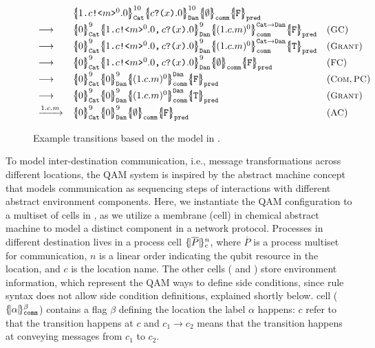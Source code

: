 \begin{figure}[t]
{\footnotesize
\[
\begin{array}{lll}
&
\pcellb{\qsend{1}{c}{m}^0.0}{10}{\cn{Cat}}
\pcellb{\qrev{c}{x}.0}{10}{\cn{Dan}} 
\qcellb{\emptyset}{\cn{comm}}
\qcellb{\texttt{F}}{\cn{pred}}
&
\\[0.3em]
\longrightarrow
&
\pcellb{0}{9}{\cn{Cat}}
\pcellb{\pard{\qsend{1}{c}{m}^0.0}{\qrev{c}{x}.0}}{9}{\cn{Dan}} 
\pcellb{(1.c.m)^0}{\cn{Cat}\rightarrow\cn{Dan}}{\cn{comm}}
\qcellb{\texttt{F}}{\cn{pred}}
&
(\rulelab{GC})
\\[0.3em]
\longrightarrow
&
\pcellb{0}{9}{\cn{Cat}}
\pcellb{\pard{\qsend{1}{c}{m}^0.0}{\qrev{c}{x}.0}}{9}{\cn{Dan}} 
\pcellb{(1.c.m)^0}{\cn{Cat}\rightarrow\cn{Dan}}{\cn{comm}}
\qcellb{\texttt{T}}{\cn{pred}}
&
(\rulelab{Grant})
\\[0.3em]
\longrightarrow
&
\pcellb{0}{9}{\cn{Cat}}
\pcellb{\pard{\qsend{1}{c}{m}^0.0}{\qrev{c}{x}.0}}{9}{\cn{Dan}} 
\qcellb{\emptyset}{\cn{comm}}
\qcellb{\texttt{F}}{\cn{pred}}
&
(\rulelab{FC})
\\[0.3em]
\longrightarrow
&
\pcellb{0}{9}{\cn{Cat}}
\pcellb{0}{9}{\cn{Dan}} 
\pcellb{(1.c.m)^0}{\cn{Dan}}{\cn{comm}}
\qcellb{\texttt{F}}{\cn{pred}}
&
(\rulelab{Com},\rulelab{PC})
\\[0.3em]
\longrightarrow
&
\pcellb{0}{9}{\cn{Cat}}
\pcellb{0}{9}{\cn{Dan}} 
\pcellb{(1.c.m)^0}{\cn{Dan}}{\cn{comm}}
\qcellb{\texttt{T}}{\cn{pred}}
&
(\rulelab{Grant})
\\[0.3em]
\xrightarrow{1.c.m}&
\pcellb{0}{9}{\cn{Cat}}
\pcellb{0}{9}{\cn{Dan}} 
\qcellb{\emptyset}{\cn{comm}}
\qcellb{\texttt{F}}{\cn{pred}}
&
(\rulelab{AC})
\end{array}
\]
}
\caption{Example transitions based on the model in .}
  \label{fig:q-pi-example}
\end{figure}

To model inter-destination communication, i.e., message transformations across different locations,
the QAM system is inspired by the abstract machine concept that models communication as sequencing steps of
interactions with different abstract environment components.
Here, we instantiate the QAM configuration to a multiset of cells in ,
as we utilize a membrane (cell) in chemical abstract machine to model a distinct component in a network protocol.
Processes in different destination lives in a process cell $\{\!| \overline{P} |\!\}^{n}_{c}$, where $\overline{P}$ is a process multiset for communication, $n$ is a linear order indicating the qubit resource in the location, and $c$ is the location name.
The other cells ( and ) store environment information, which represent the QAM ways to define side conditions, since rule syntax does not allow side condition definitions, explained shortly below. 
 cell ($\{\!| \alpha |\!\}^{\beta}_{\texttt{comm}}$) contains a flag $\beta$ defining the location the label $\alpha$ happens: $c$ refer to that the transition happens at $c$ and $c_1\rightarrow c_2$ means that the transition happens at conveying messages from $c_1$ to $c_2$.

